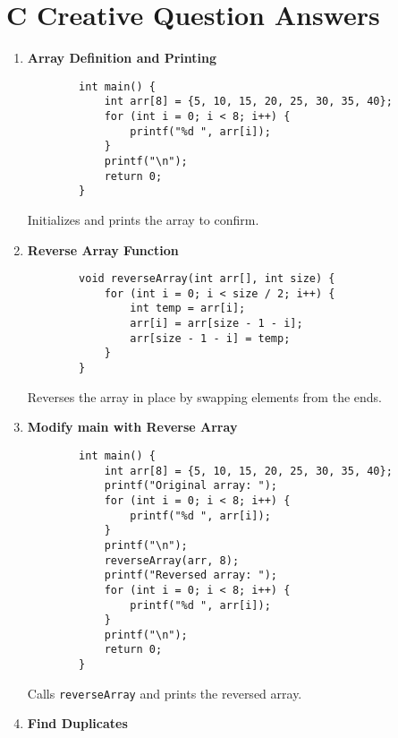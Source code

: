 \documentclass[a4paper,12pt]{article}
\begin{document}
\section{C Creative Question Answers}

\begin{enumerate}
    \item \textbf{Array Definition and Printing}

    \lstset{language=C}
    \begin{lstlisting}
        int main() {
            int arr[8] = {5, 10, 15, 20, 25, 30, 35, 40};
            for (int i = 0; i < 8; i++) {
                printf("%d ", arr[i]);
            }
            printf("\n");
            return 0;
        }
    \end{lstlisting}

    Initializes and prints the array to confirm.

    \item \textbf{Reverse Array Function}

    \lstset{language=C}
    \begin{lstlisting}
        void reverseArray(int arr[], int size) {
            for (int i = 0; i < size / 2; i++) {
                int temp = arr[i];
                arr[i] = arr[size - 1 - i];
                arr[size - 1 - i] = temp;
            }
        }
    \end{lstlisting}

    Reverses the array in place by swapping elements from the ends.

    \item \textbf{Modify main with Reverse Array}

    \lstset{language=C}
    \begin{lstlisting}
        int main() {
            int arr[8] = {5, 10, 15, 20, 25, 30, 35, 40};
            printf("Original array: ");
            for (int i = 0; i < 8; i++) {
                printf("%d ", arr[i]);
            }
            printf("\n");
            reverseArray(arr, 8);
            printf("Reversed array: ");
            for (int i = 0; i < 8; i++) {
                printf("%d ", arr[i]);
            }
            printf("\n");
            return 0;
        }
    \end{lstlisting}

    Calls \verb|reverseArray| and prints the reversed array.

    \item \textbf{Find Duplicates}


\end{enumerate}
\end{document}

